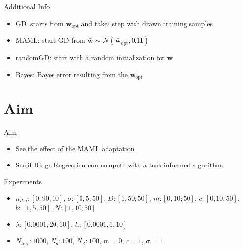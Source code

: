 \documentclass[aspectratio=169]{beamer}
\begin{document}
\begin{frame}{Additional Info}
  \begin{itemize}
    \item GD: starts from $\bar{\mathbf{w}}_{\text{opt}}$ and takes step with drawn training samples
    \item MAML: start GD from $\bar{\mathbf{w}}\sim\mathcal{N}(\bar{\mathbf{w}}_{\text{opt}},0.1\mathbf{I})$
    \item randomGD: start with a random initialization for $\bar{\mathbf{w}}$
    \item Bayes: Bayes error resulting from the $\bar{\mathbf{w}}_{\text{opt}}$
  \end{itemize}
\end{frame}

\section{Aim}
\begin{frame}{Aim}
  \begin{itemize}
    \item See the effect of the MAML adaptation.
    \item See if Ridge Regression can compete with a task informed algorithm.
  \end{itemize}
\end{frame}

\begin{frame}{Experiments}
  \begin{itemize}
		\item $n_{iter}:[0,90;10]$, $\sigma:[0,5;50]$, $D:[1,50;50]$, $m:[0,10;50]$, $c:[0,10,50]$, $b:[1,5,50]$, $N:[1,10;50]$
	\item $\lambda:[0.0001,20;10]$, $l_r:[0.0001,1,10]$
	\item  $N_{test}:1000$, $N_{a}:100$, $N_{Z}:100$, $m=0$, $c=1$, $\sigma=1$
  \end{itemize}
\end{frame}
\end{document}
